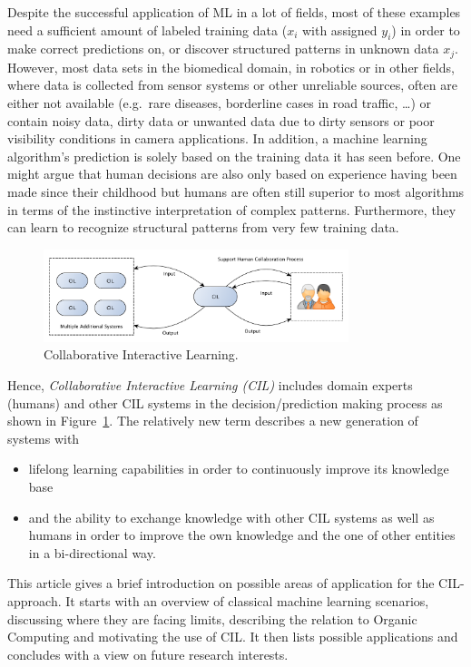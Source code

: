 \documentclass[conference]{IEEEtran}
\begin{document}
Despite the successful application of ML in a lot of fields, most of these examples 
need a sufficient amount of labeled training data ($x_i$ with assigned $y_i$) in order to make 
correct predictions on, or discover structured patterns in unknown data $x_j$. However, most 
data sets in the biomedical domain, in robotics or in other fields, where data is collected 
from sensor systems or other unreliable sources, often are either not available (e.g.\ rare 
diseases, borderline cases in road traffic, \dots) or contain noisy data, dirty data or unwanted 
data due to dirty sensors or poor visibility conditions in camera applications.
In addition, a machine learning algorithm's prediction is solely based on the training data it 
has seen before. One might argue that human decisions are also only based on experience having been
made since their childhood but humans are often still superior to most algorithms in terms of 
the instinctive interpretation of complex patterns. Furthermore, they can learn to recognize 
structural patterns from very few training data.

\begin{figure}[!h]
\centering
\includegraphics[width=3.5in]{images/CIL}
\caption{Collaborative Interactive Learning.}
\label{fig:CIL}
\end{figure}

Hence, \textit{Collaborative Interactive Learning (CIL)} includes domain experts (humans) 
and other CIL systems in the decision/prediction making process as shown in 
Figure~\ref{fig:CIL}. The relatively new term describes a new 
generation of systems with
\begin{itemize}
    \item lifelong learning capabilities in order to continuously improve its 
        knowledge base
    \item and the ability to exchange knowledge with other CIL systems as well as humans 
        in order to improve the own knowledge and the one of other entities in a 
        bi-directional way\cite{CIL:sick}.
\end{itemize}

This article gives a brief introduction on possible areas of application for the CIL-approach. 
It starts with an overview of classical machine learning scenarios, discussing where they are 
facing limits, describing the relation to Organic Computing and motivating the use of CIL\@. 
It then lists possible applications and concludes 
with a view on future research interests.
\end{document}
